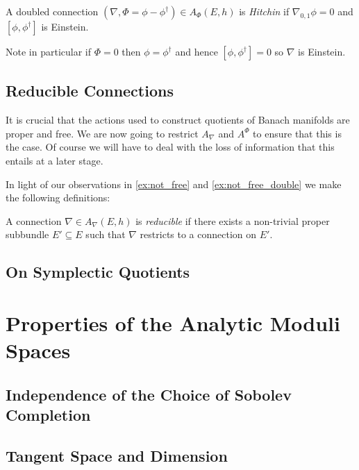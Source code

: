 \documentclass[12pt]{ociamthesis}  %
\begin{document}
\begin{definition}
  A doubled connection $(\nabla,\Phi=\phi-\phi^\dagger)\in A_\Phi(E,h)$ is \emph{Hitchin}
  if $\nabla_{0,1}\phi = 0$ and $[\phi,\phi^\dagger]$ is Einstein.
\end{definition}

Note in particular if $\Phi = 0$ then $\phi = \phi^\dagger$ and hence
$[\phi,\phi^\dagger] = 0$ so $\nabla$ is Einstein.

\subsection{Reducible Connections}

It is crucial that the actions used to construct quotients of Banach manifolds
are proper and free. We are now going to restrict $A_\nabla$ and $A^\Phi$ to
ensure that this is the case. Of course we will have to deal with the loss of
information that this entails at a later stage.

In light of our observations in \ref{ex:not_free} and \ref{ex:not_free_double}
we make the following definitions:

\begin{definition}
  A connection $\nabla\in A_\nabla (E,h)$ is \emph{reducible} if there exists
  a non-trivial proper subbundle $E'\subseteq E$ such that $\nabla$ restricts
  to a connection on $E'$.
\end{definition}

\subsection{On Symplectic Quotients}

\section{Properties of the Analytic Moduli Spaces}

\subsection{Independence of the Choice of Sobolev Completion}

\subsection{Tangent Space and Dimension}
\end{document}
